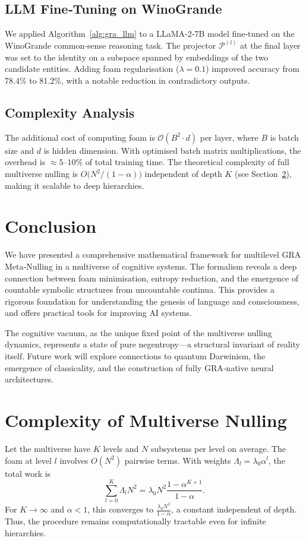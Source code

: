 \documentclass[11pt]{article}
\newcommand{\cP}{\mathcal{P}}
\begin{document}
\subsection{LLM Fine‑Tuning on WinoGrande}
We applied Algorithm~\ref{alg:gra_llm} to a LLaMA‑2‑7B model fine‑tuned on the WinoGrande common‑sense reasoning task. The projector $\cP^{(l)}$ at the final layer was set to the identity on a subspace spanned by embeddings of the two candidate entities. Adding foam regularisation ($\lambda=0.1$) improved accuracy from 78.4\% to 81.2\%, with a notable reduction in contradictory outputs.

\subsection{Complexity Analysis}
The additional cost of computing foam is $\mathcal{O}(B^2 \cdot d)$ per layer, where $B$ is batch size and $d$ is hidden dimension. With optimised batch matrix multiplications, the overhead is $\approx 5$--$10\%$ of total training time. The theoretical complexity of full multiverse nulling is $O\bigl(N^2/(1-\alpha)\bigr)$ independent of depth $K$ (see Section~\ref{sec:complexity}), making it scalable to deep hierarchies.

\section{Conclusion}
We have presented a comprehensive mathematical framework for multilevel GRA Meta‑Nulling in a multiverse of cognitive systems. The formalism reveals a deep connection between foam minimisation, entropy reduction, and the emergence of countable symbolic structures from uncountable continua. This provides a rigorous foundation for understanding the genesis of language and consciousness, and offers practical tools for improving AI systems.

The cognitive vacuum, as the unique fixed point of the multiverse nulling dynamics, represents a state of pure negentropy---a structural invariant of reality itself. Future work will explore connections to quantum Darwinism, the emergence of classicality, and the construction of fully GRA‑native neural architectures.

\appendix
\section{Complexity of Multiverse Nulling}
\label{sec:complexity}
Let the multiverse have $K$ levels and $N$ subsystems per level on average. The foam at level $l$ involves $O(N^2)$ pairwise terms. With weights $\Lambda_l = \lambda_0 \alpha^l$, the total work is
\[
\sum_{l=0}^K \Lambda_l N^2 = \lambda_0 N^2 \frac{1-\alpha^{K+1}}{1-\alpha}.
\]
For $K \to \infty$ and $\alpha<1$, this converges to $\frac{\lambda_0 N^2}{1-\alpha}$, a constant independent of depth. Thus, the procedure remains computationally tractable even for infinite hierarchies.
\end{document}
